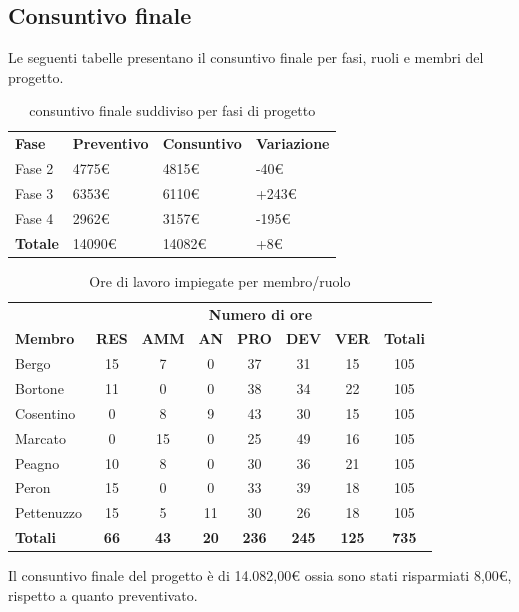 	
\newpage
\subsection{Consuntivo finale}
Le seguenti tabelle presentano il consuntivo finale per fasi, ruoli e membri del progetto.

\begin{table}[H]
			\centering
		\begin{tabular}{| l | l | l | l |}
			\rowcolor{LightBlue}
			\textbf{\color{white}Fase}
			& \textbf{\color{white}Preventivo}
			& \textbf{\color{white}Consuntivo}
			& \textbf{\color{white}Variazione}
			\\
			
			Fase 2 			& 4775€ 	& 4815€ & -40€\\
			Fase 3 		& 6353€ 	& 6110€ & +243€\\
			Fase 4			& 2962€ 	& 3157€ & -195€ \\
			\textbf{Totale} & 14090€ & 14082€ & +8€\\ \hline
		\end{tabular}
		\caption{consuntivo finale suddiviso per fasi di progetto}	
\end{table}

\begin{table}[H]
			\centering
			
			\begin{tabular}{| l | c c c c c c | c |}
			\rowcolor{LightBlue}
			& \multicolumn{7}{c}{\textbf{\color{white}Numero di ore}}	\\
			
			\rowcolor{LightBlue}
			\textbf{\color{white}Membro}
			& \textbf{\color{white}RES}
			& \textbf{\color{white}AMM}
			& \textbf{\color{white}AN}
			& \textbf{\color{white}PRO}
			& \textbf{\color{white}DEV}
			& \textbf{\color{white}VER}
			& \textbf{\color{white}Totali}\\
			Bergo & 15 & 7 & 0 & 37 & 31 & 15 & 105\\
			Bortone & 11 & 0 & 0 & 38 & 34 & 22 & 105\\
			Cosentino & 0 & 8 & 9 & 43 & 30 & 15 & 105\\
			Marcato  & 0 & 15 & 0 & 25 & 49 & 16 & 105\\
			Peagno & 10 & 8 & 0 & 30 & 36 & 21 & 105\\
			Peron   & 15 & 0 & 0 & 33 & 39 & 18 & 105\\
			Pettenuzzo & 15 & 5 & 11 & 30 & 26 & 18 & 105\\ 
			\hline
			\rowcolor{LightBlue}
			\textbf{\color{white}Totali} & \textbf{\color{white}66} & \textbf{\color{white}43} & \textbf{\color{white}20} & \textbf{\color{white}236} & \textbf{\color{white}245} & \textbf{\color{white}125} & \textbf{\color{white}735} \\ \hline
			
		\end{tabular}
		\caption{Ore di lavoro impiegate per membro/ruolo}
	\end{table}
	
	Il consuntivo finale del progetto è di 14.082,00€ ossia sono stati risparmiati 8,00€, rispetto a quanto preventivato.


